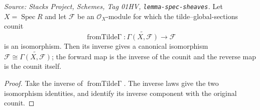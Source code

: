 \begin{lemma}\leanok
  \label{lem:qcoh_iso_tilde_sections}
  \textit{Source: Stacks Project, Schemes, Tag 01HV, \texttt{lemma-spec-sheaves}.}
  Let \(X = \operatorname{Spec} R\) and let \(\mathcal{F}\) be an
  \(\mathcal{O}_X\)-module for which the tilde--global-sections counit
  \[
    \operatorname{fromTilde\Gamma} :
      \widetilde{\Gamma(X,\mathcal F)} \longrightarrow \mathcal F
  \]
  is an isomorphism. Then its inverse gives a canonical isomorphism
  \(\mathcal F\cong\widetilde{\Gamma(X,\mathcal F)}\); the forward map is
  the inverse of the counit and the reverse map is the counit itself.
\end{lemma}
\begin{proof}\leanok
  Take the inverse of
  \(\operatorname{fromTilde\Gamma}\). The inverse laws give the two
  isomorphism identities, and identify its inverse component with the
  original counit.
\end{proof}


